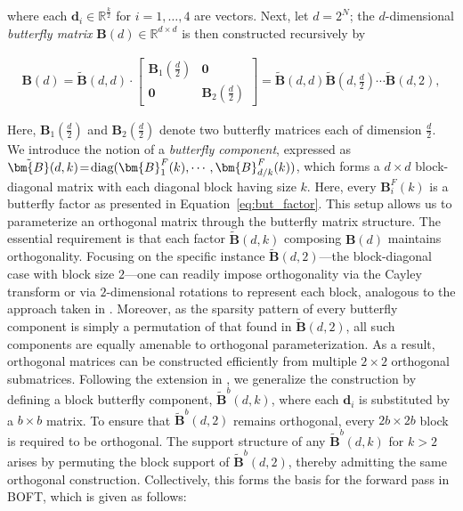 where each $\bm{d}_i\in\mathbb{R}^{\frac{k}{2}}$ for $i = 1, \ldots, 4$ are vectors. Next, let $d=2^N$; the $d$-dimensional \emph{butterfly matrix} $\bm{B}(d)\in\mathbb{R}^{d\times d}$ is then constructed recursively by

\begin{equation}
\begin{aligned}
    \!\!\bm{B}(d)=\tilde{\bm{B}}(d,d)\!\cdot\!\begin{bmatrix}
    \bm{B}_1(\frac{d}{2})\!\!\!\!\! & \bm{0} \\
    \bm{0}\!\!\!\!\! &\bm{B}_2(\frac{d}{2})
    \end{bmatrix}= \tilde{\bm{B}}(d,d)\tilde{\bm{B}}(d,\frac{d}{2})\cdots\tilde{\bm{B}}(d,2),
\end{aligned}
\end{equation}

Here, $\bm{B}_1(\frac{d}{2})$ and $\bm{B}_2(\frac{d}{2})$ denote two butterfly matrices each of dimension $\frac{d}{2}$. We introduce the notion of a \emph{butterfly component}, expressed as $\thickmuskip=2mu \medmuskip=2mu \tilde{\bm{B}}(d,k)=\text{diag}(\bm{B}^F_1(k),\cdots,\bm{B}^F_{d/k}(k))$, which forms a $d\times d$ block-diagonal matrix with each diagonal block having size $k$. Here, every $\bm{B}^F_i(k)$ is a butterfly factor as presented in Equation~\ref{eq:but_factor}. This setup allows us to parameterize an orthogonal matrix through the butterfly matrix structure. The essential requirement is that each factor $\tilde{\bm{B}}(d,k)$ composing $\bm{B}(d)$ maintains orthogonality. Focusing on the specific instance $\tilde{\bm{B}}(d,2)$—the block-diagonal case with block size $2$—one can readily impose orthogonality via the Cayley transform or via $2$-dimensional rotations to represent each block, analogous to the approach taken in \cite{liu2021orthogonal,qiu2023controlling}. Moreover, as the sparsity pattern of every butterfly component is simply a permutation of that found in $\tilde{\bm{B}}(d,2)$, all such components are equally amenable to orthogonal parameterization. As a result, orthogonal matrices can be constructed efficiently from multiple $2\times 2$ orthogonal submatrices. Following the extension in \cite{chen2022pixelated}, we generalize the construction by defining a block butterfly component, $\tilde{\bm{B}}^b(d,k)$, where each $\bm{d}_i$ is substituted by a $b\times b$ matrix. To ensure that $\tilde{\bm{B}}^b(d,2)$ remains orthogonal, every $2b\times 2b$ block is required to be orthogonal. The support structure of any $\tilde{\bm{B}}^b(d,k)$ for $k>2$ arises by permuting the block support of $\tilde{\bm{B}}^b(d,2)$, thereby admitting the same orthogonal construction. Collectively, this forms the basis for the forward pass in BOFT, which is given as follows:

